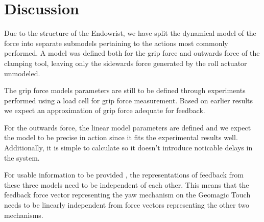 \section{Discussion}
Due to the structure of the Endowrist, we have split the dynamical model of the force into separate submodels pertaining to the actions most commonly performed.
A model was defined both for the grip force and outwards force of the clamping tool, leaving only the sidewards force generated by the roll actuator unmodeled.

The grip force models parameters are still to be defined through experiments performed using a load cell for grip force measurement.
Based on earlier results \cite{kim2014dynamic} we expect an approximation of grip force adequate for feedback.

For the outwards force, the linear model parameters are defined and we expect the model to be precise in action since it fits the experimental results well.
Additionally, it is simple to calculate so it doesn't introduce noticable delays in the system.

For usable information to be provided , the representations of feedback from these three models need to be independent of each other.
This means that the feedback force vector representing the yaw mechanism on the Geomagic Touch needs to be linearly independent from force vectors representing the other two mechanisms.